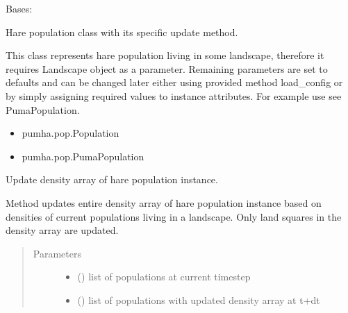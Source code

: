 \documentclass[letterpaper,10pt,english]{sphinxmanual}
\begin{document}
\begin{fulllineitems}
\label{\detokenize{pumha:pumha.pop.HarePopulation}}
Bases: {\hyperref[\detokenize{pumha:pumha.pop.Population}]{}}

Hare population class with its specific update method.

This class represents hare population living in some landscape, therefore
it requires Landscape object as a parameter. Remaining parameters are set
to defaults and can be changed later either using provided method
load\_config or by simply assigning required values to instance attributes.
For example use see PumaPopulation.

\begin{itemize}
\item {} 
pumha.pop.Population

\item {} 
pumha.pop.PumaPopulation

\end{itemize}

\begin{fulllineitems}
\label{\detokenize{pumha:pumha.pop.HarePopulation.update_density}}
Update density array of hare population instance.

Method updates entire density array of hare population instance based
on densities of current populations living in a landscape. Only land
squares in the density array are updated.
\begin{quote}\begin{description}
\item[{Parameters}] \leavevmode\begin{itemize}
\item {} 
 () \textendash{} list of populations at current timestep

\item {} 
 () \textendash{} list of populations with updated density array at t+dt


\end{itemize}
\end{description}
\end{quote}
\end{fulllineitems}
\end{fulllineitems}
\end{document}
